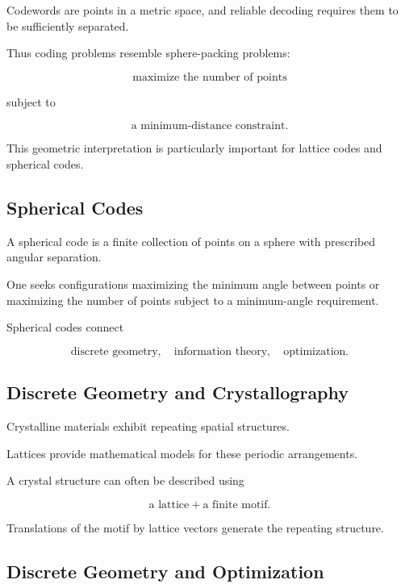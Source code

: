 Codewords are points in a metric space, and reliable decoding requires them
to be sufficiently separated.

Thus coding problems resemble sphere-packing problems:

\[
\boxed{
\text{maximize the number of points}
}
\]

subject to

\[
\boxed{
\text{a minimum-distance constraint}.
}
\]

This geometric interpretation is particularly important for lattice codes
and spherical codes.

\subsection{Spherical Codes}
\label{subsec:spherical-codes}

A spherical code is a finite collection of points on a sphere with prescribed
angular separation.

One seeks configurations maximizing the minimum angle between points or
maximizing the number of points subject to a minimum-angle requirement.

Spherical codes connect

\[
\boxed{
\text{discrete geometry},
\quad
\text{information theory},
\quad
\text{optimization}.
}
\]

\subsection{Discrete Geometry and Crystallography}
\label{subsec:discrete-geometry-crystallography}

Crystalline materials exhibit repeating spatial structures.

Lattices provide mathematical models for these periodic arrangements.

A crystal structure can often be described using

\[
\boxed{
\text{a lattice}
+
\text{a finite motif}.
}
\]

Translations of the motif by lattice vectors generate the repeating
structure.

\subsection{Discrete Geometry and Optimization}
\label{subsec:discrete-geometry-optimization}

